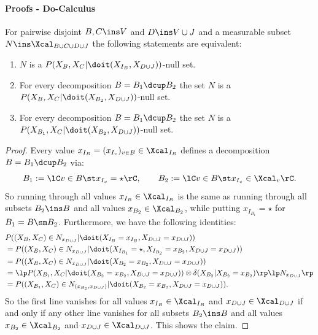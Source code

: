 \paragraph{Proofs - Do-Calculus}\hfill%


\begin{Lem}
    \label{lem:int-null-set}
    For pairwise disjoint $B,C \ins V$ and $D \ins V \cup J$ and a measurable subset $N \ins \Xcal_{B \cup C\cup D \cup J}$ the following statements are equivalent:
    \begin{enumerate}
        \item $N$ is a $P(X_B,X_C|\doit(X_{I_B},X_{D\cup J}))$-null set.
        \item For every decomposition $B=B_1 \dcup B_2$ the set $N$ is a 
            $P(X_B,X_C|\doit(X_{B_2},X_{D\cup J}))$-null set.
        \item For every decomposition $B=B_1 \dcup B_2$ the set $N$ is a 
            $P(X_{B_1},X_C|\doit(X_{B_2},X_{D\cup J}))$-null set.
    \end{enumerate}
\begin{proof}
    Every value $x_{I_B}=(x_{I_v})_{v \in B} \in \Xcal_{I_B}$ defines a decomposition $B=B_1 \dcup B_2$ via:
    \[ B_1 := \lC v \in B \st x_{I_v} = \star \rC, \qquad B_2 := \lC v \in B \st x_{I_v} \in \Xcal_v \rC.  \]
    So running through all values $x_{I_B} \in \Xcal_{I_B}$ is the same as running through all subsets $B_2 \ins B$ and all values $x_{B_2} \in \Xcal_{B_2}$, while putting $x_{I_{B_1}}=\star$ for $B_1 = B \sm B_2$.
    Furthermore, we have the following identities:
    \begin{align*}
          &   P((X_B,X_C) \in N_{x_{D\cup J}}|\doit(X_{I_B}=x_{I_B},X_{D\cup J}=x_{D\cup J})) \\
        &=   P((X_B,X_C) \in N_{x_{D\cup J}}|\doit(X_{I_{B_1}} = \star ,X_{I_{B_2}}=x_{B_2},X_{D\cup J}=x_{D\cup J})) \\
     &=   P((X_B,X_C) \in N_{x_{D\cup J}}|\doit(X_{B_2}=x_{B_2},X_{D\cup J}=x_{D\cup J})) \\
     &= \lp P(X_{B_1},X_C|\doit(X_{B_2}=x_{B_2},X_{D\cup J}=x_{D\cup J})) \otimes \delta(X_{B_2}|X_{B_2}=x_{B_2})\rp\lp N_{x_{D\cup J}} \rp \\
     &= P((X_{B_1},X_C) \in N_{(x_{B_2},x_{D\cup J})}|\doit(X_{B_2}=x_{B_2},X_{D\cup J}=x_{D\cup J})).
    \end{align*}
    So the first line vanishes for all values $x_{I_B} \in \Xcal_{I_B}$ and $x_{D\cup J} \in \Xcal_{D\cup J}$ if and only if any other line vanishes
    for all subsets $B_2 \ins B$ and all values $x_{B_2} \in \Xcal_{B_2}$ and $x_{D\cup J} \in \Xcal_{D\cup J}$.
    This shows the claim.
\end{proof}
\end{Lem}

